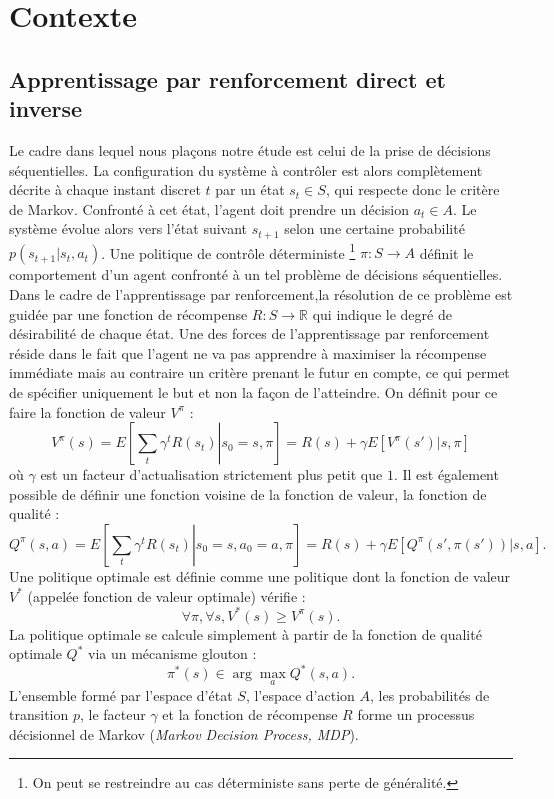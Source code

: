 \documentclass[publibook-draft]{CAp2012}
\begin{document}
\section{Contexte}
\label{back.sec}
\subsection{Apprentissage par renforcement direct et inverse}
Le cadre dans lequel nous plaçons notre étude est celui de la prise de décisions séquentielles. La configuration du système à contrôler est alors complètement décrite à chaque instant discret $t$ par un état $s_t \in S$, qui respecte donc le critère de Markov. Confronté à cet état, l'agent doit prendre un décision $a_t\in A$. Le système évolue alors vers l'état suivant $s_{t+1}$ selon une certaine probabilité $p(s_{t+1}|s_t, a_t)$. Une politique de contrôle déterministe \footnote{On peut se restreindre au cas déterministe sans perte de généralité.} $\pi : S\rightarrow A$ définit le comportement d'un agent confronté à un tel problème de décisions séquentielles.\\

Dans le cadre de l'apprentissage par renforcement,la résolution de ce problème est guidée par une fonction de récompense $R : S \rightarrow \mathbb{R}$ qui indique le degré de désirabilité de chaque état. Une des forces de l'apprentissage par renforcement réside dans le fait que l'agent ne va pas apprendre à maximiser la récompense immédiate mais au contraire un critère prenant le futur en compte, ce qui permet de spécifier uniquement le but et non la façon de l'atteindre. On définit pour ce faire la fonction de valeur $V^\pi$ :
\begin{equation}
\label{Vdef.eqn}
V^\pi(s) = E\left[\left.\sum_t\gamma^tR(s_t)\right|s_0=s,\pi\right]=R(s) + \gamma E[V^\pi(s')|s,\pi]
\end{equation}
où $\gamma$ est un facteur d'actualisation strictement plus petit que $1$. Il est également possible de définir une fonction voisine de la fonction de valeur, la fonction de qualité :
\begin{equation}
\label{Qdef.eqn}
Q^\pi(s,a) = E\left[\left.\sum_t\gamma^tR(s_t)\right|s_0=s,a_0=a,\pi\right] = R(s) + \gamma E[Q^\pi(s',\pi(s'))|s,a].
\end{equation}
  Une politique optimale est définie comme une politique dont la fonction de valeur $V^*$ (appelée fonction de valeur optimale) vérifie :
\begin{equation}
\forall \pi, \forall s, V^*(s) \geq V^\pi(s).
\end{equation}
La politique optimale se calcule simplement à partir de la fonction de qualité optimale $Q^*$ via un mécanisme glouton :
\begin{equation}
\label{greedy.eqn}
\pi^*(s) \in \arg\max_a Q^*(s,a).
\end{equation}
L'ensemble formé par l'espace d'état $S$, l'espace d'action $A$, les probabilités de transition $p$, le facteur $\gamma$ et la fonction de récompense $R$ forme un processus décisionnel de Markov ({\it Markov Decision Process, MDP}).\\
\end{document}
